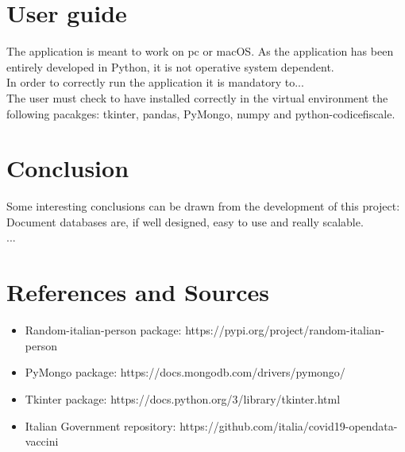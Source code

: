 \documentclass{article}
\begin{document}
\newpage

\section{User guide}
The application is meant to work on pc or macOS. As the application has been entirely developed in Python, it is not
operative system dependent.
\\In order to correctly run the application it is mandatory to...
\\The user must check to have installed correctly in the virtual environment the following pacakges: {\selectfont tkinter, pandas, PyMongo, numpy and python-codicefiscale}.

\section{Conclusion}

Some interesting conclusions can be drawn from the development of this project: Document databases are, if well designed, easy to use and really scalable. \\

...

\section{References and Sources}
\begin{itemize}
    \item Random-italian-person package: https://pypi.org/project/random-italian-person
    \item PyMongo package: https://docs.mongodb.com/drivers/pymongo/
    \item Tkinter package: https://docs.python.org/3/library/tkinter.html
    \item Italian Government repository: https://github.com/italia/covid19-opendata-vaccini
\end{itemize}
\end{document}
